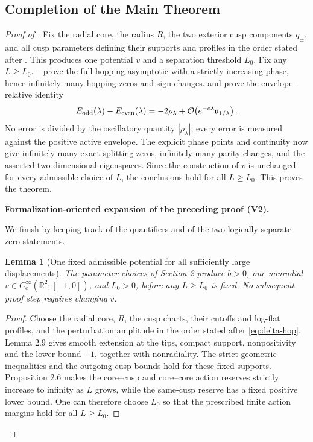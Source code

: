 \documentclass[11pt]{article}
\newtheorem{lemma}[theorem]{Lemma}
\newcommand{\formalisationparentid}{X}
\newenvironment{formalisationaddition}[1]{\par\medskip\begingroup\color{blue}\def\formalisationparentid{#1}\setcounter{formalizationsublemma}{0}\let\lemma\formalizationsublemma\let\endlemma\endformalizationsublemma
  \def\Eo{\mathcal E_h^\circ}\def\EE{\mathcal E_h}\def\phio{\phi_h^\circ}\def\phih{\phi_h}\def\Ho{H_h^{\rm atom}(v^\circ)}\def\Ha{H_h^{\rm atom}}\def\HL{H_h^{L}}\def\Dh{D_h}\def\Log{\operatorname{Log}}\def\ellh{\ell_h}\def\Gp{G_{p,h}}\def\Ast{A_{*,h}}\def\ahat{\widehat{\mathfrak a}_h}\def\ah{\mathfrak a_h}\def\rh{\widehat\rho_h}\def\deltah{\widehat\delta_h}\def\oldref##1{\textup{(##1)}}\def\interface##1{\par\noindent\textit{Analytical interface used here.} ##1\par}\def\finish{\par\noindent\textit{Conclusion of the formalization-oriented expansion.} }\par\noindent\textbf{Formalization-oriented expansion of the preceding proof (V2).}\par\smallskip
}{\par\endgroup\medskip
}
\newcommand{\R}{\mathbb R}
\newcommand{\cO}{\mathcal O}
\begin{document}
\subsection{Completion of the Main Theorem}
\begin{proof}[Proof of ]
Fix the radial core, the radius $R$, the two exterior cusp components $q_\pm$, and all cusp
parameters defining their supports and profiles in the order stated after .  This produces one
potential $v$ and a separation threshold $L_0$.  Fix any $L\ge L_0$.
-- prove the full
hopping asymptotic with a strictly increasing phase, hence infinitely many
hopping zeros and sign changes.   and
 prove the envelope-relative identity
\[
 E_{\rm odd}(\lambda)-E_{\rm even}(\lambda)
 =-2\rho_\lambda
 +\cO\!\left(e^{-c\lambda}\mathfrak a_{1/\lambda}\right).
\]
No error is divided by the oscillatory quantity $|\rho_\lambda|$; every
error is measured against the positive active envelope.  The explicit phase
points and continuity now give infinitely many exact splitting zeros,
infinitely many parity changes, and the asserted two-dimensional eigenspaces.
Since the construction of $v$ is unchanged for every admissible choice of
$L$, the conclusions hold for all $L\ge L_0$.  This proves the theorem.

\begin{formalisationaddition}{T1.1}
We finish by keeping track of the quantifiers and of the two logically separate zero statements.

\begin{lemma}[One fixed admissible potential for all sufficiently large displacements]\label{sublemma:T1-1-fixed-potential}
The parameter choices of Section 2 produce $b>0$, one nonradial $v\in C_c^\infty(\R^2;[-1,0])$, and $L_0>0$, before any $L\ge L_0$ is fixed. No subsequent proof step requires changing $v$.
\end{lemma}
\begin{proof}
Choose the radial core, $R$, the cusp charts, their cutoffs and log-flat profiles, and the perturbation amplitude in the order stated after \eqref{eq:delta-hop}. Lemma 2.9 gives smooth extension at the tips, compact support, nonpositivity and the lower bound $-1$, together with nonradiality. The strict geometric inequalities and the outgoing-cusp bounds hold for these fixed supports. Proposition 2.6 makes the core--cusp and core--core action reserves strictly increase to infinity as $L$ grows, while the same-cusp reserve has a fixed positive lower bound. One can therefore choose $L_0$ so that the prescribed finite action margins hold for all $L\ge L_0$.


\end{proof}
\end{formalisationaddition}
\end{proof}
\end{document}
